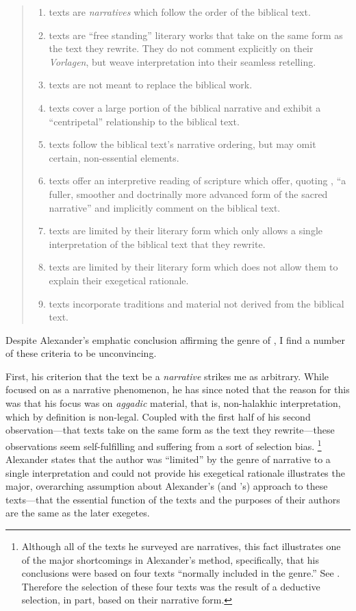 \begin{quote}
\begin{enumerate}
    \item \rwb texts are \emph{narratives} which follow the order of the biblical text. 
    \item \rwb texts are ``free standing'' literary works that take on the same form as the text they rewrite. They do not comment explicitly on their \emph{Vorlagen}, but weave interpretation into their seamless retelling. 
    \item \rwb texts are not meant to replace the biblical work. 
    \item \rwb texts cover a large portion of the biblical narrative and exhibit a ``centripetal'' relationship to the biblical text. 
    \item \rwb texts follow the biblical text's narrative ordering, but may omit certain, non-essential elements. 
    \item \rwb texts offer an interpretive reading of scripture which offer, quoting \vermes, ``a fuller, smoother and doctrinally more advanced form of the sacred narrative''\autocite[Citing \vermes in][305]{schurer1986} and implicitly comment on the biblical text. 
    \item \rwb texts are limited by their literary form which only allows a single interpretation of the biblical text that they rewrite. 
    \item \rwb texts are limited by their literary form which does not allow them to explain their exegetical rationale. 
    \item \rwb texts incorporate traditions and material not derived from the biblical text.
\end{enumerate}
\end{quote} 
\noindent
Despite Alexander's emphatic conclusion affirming the genre of \rwb, I find a number of these criteria to be unconvincing.

First, his criterion that the text be a \emph{narrative} strikes me as arbitrary. While \vermes focused on \rwb as a narrative phenomenon, he has since noted that the reason for this was that his focus was on \emph{aggadic} material, that is, non-halakhic interpretation, which by definition is non-legal. Coupled with the first half of his second observation---that \rwb texts take on the same form as the text they rewrite---these observations seem self-fulfilling and suffering from a sort of selection bias.%
    \footnote{%
        Although all of the texts he surveyed are narratives, this fact illustrates one of the major shortcomings in Alexander's method, specifically, that his conclusions were based on four texts ``normally included in the genre.'' See 
        \cite[99]{alexander_carson-williamson1988}. 
        Therefore the selection of these four texts was the result of a deductive selection, in part, based on their narrative form.}
Alexander states that the author was ``limited'' by the genre of narrative to a single interpretation and could not provide his exegetical rationale illustrates the major, overarching assumption about Alexander's (and \vermes's) approach to these texts---that the essential function of the texts and the purposes of their authors are the same as the later exegetes.

